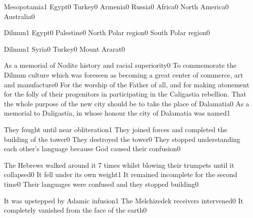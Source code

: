 {Mesopotamia}{1}
{Egypt}{0}
{Turkey}{0}
{Armenia}{0}
{Russia}{0}
{Africa}{0}
{North America}{0}
{Australia}{0}
\qstop

{Dilmun}{1}
{Egypt}{0}
{Palestine}{0}
{North Polar region}{0}
{South Polar region}{0}
\qstop

{Dilmun}{1}
{Syria}{0}
{Turkey}{0}
{Mount Ararat}{0}
\qstop

{As a memorial of Nodite history and racial superiority}{0}
{To commemorate the Dilmun culture which was foreseen as becoming a great center of commerce, art and manufacture}{0}
{For the worship of the Father of all, and for making atonement for the folly of their progenitors in participating in the Caligastia rebellion. That the whole purpose of the new city should be to take the place of Dalamatia}{0}
{As a memorial to Daligastia, in whose honour the city of Dalamatia was named}{1}
\qstop

{They fought until near obliteration}{1}
{They joined forces and completed the building of the tower}{0}
{They destroyed the tower}{0}
{They stopped understanding each other's language because God caused their confusion}{0}
\qstop

{The Hebrews walked around it 7 times whilst blowing their trumpets until it collapsed}{0}
{It fell under its own weight}{1}
{It remained incomplete for the second time}{0}
{Their languages were confused and they stopped building}{0}
\qstop

{It was upstepped by Adamic infusion}{1}
{The Melchizedek receivers intervened}{0}
{It completely vanished from the face of the earth}{0}
\qstop

